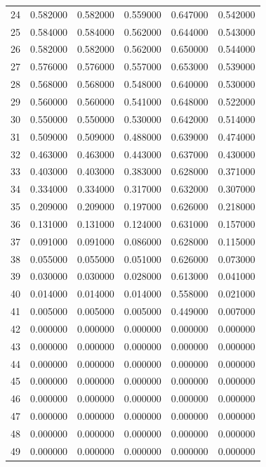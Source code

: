 \begin{tabular}{lrrrrr}
24 & 0.582000 & 0.582000 & 0.559000 & 0.647000 & 0.542000 \\
25 & 0.584000 & 0.584000 & 0.562000 & 0.644000 & 0.543000 \\
26 & 0.582000 & 0.582000 & 0.562000 & 0.650000 & 0.544000 \\
27 & 0.576000 & 0.576000 & 0.557000 & 0.653000 & 0.539000 \\
28 & 0.568000 & 0.568000 & 0.548000 & 0.640000 & 0.530000 \\
29 & 0.560000 & 0.560000 & 0.541000 & 0.648000 & 0.522000 \\
30 & 0.550000 & 0.550000 & 0.530000 & 0.642000 & 0.514000 \\
31 & 0.509000 & 0.509000 & 0.488000 & 0.639000 & 0.474000 \\
32 & 0.463000 & 0.463000 & 0.443000 & 0.637000 & 0.430000 \\
33 & 0.403000 & 0.403000 & 0.383000 & 0.628000 & 0.371000 \\
34 & 0.334000 & 0.334000 & 0.317000 & 0.632000 & 0.307000 \\
35 & 0.209000 & 0.209000 & 0.197000 & 0.626000 & 0.218000 \\
36 & 0.131000 & 0.131000 & 0.124000 & 0.631000 & 0.157000 \\
37 & 0.091000 & 0.091000 & 0.086000 & 0.628000 & 0.115000 \\
38 & 0.055000 & 0.055000 & 0.051000 & 0.626000 & 0.073000 \\
39 & 0.030000 & 0.030000 & 0.028000 & 0.613000 & 0.041000 \\
40 & 0.014000 & 0.014000 & 0.014000 & 0.558000 & 0.021000 \\
41 & 0.005000 & 0.005000 & 0.005000 & 0.449000 & 0.007000 \\
42 & 0.000000 & 0.000000 & 0.000000 & 0.000000 & 0.000000 \\
43 & 0.000000 & 0.000000 & 0.000000 & 0.000000 & 0.000000 \\
44 & 0.000000 & 0.000000 & 0.000000 & 0.000000 & 0.000000 \\
45 & 0.000000 & 0.000000 & 0.000000 & 0.000000 & 0.000000 \\
46 & 0.000000 & 0.000000 & 0.000000 & 0.000000 & 0.000000 \\
47 & 0.000000 & 0.000000 & 0.000000 & 0.000000 & 0.000000 \\
48 & 0.000000 & 0.000000 & 0.000000 & 0.000000 & 0.000000 \\
49 & 0.000000 & 0.000000 & 0.000000 & 0.000000 & 0.000000 \\

\end{tabular}
